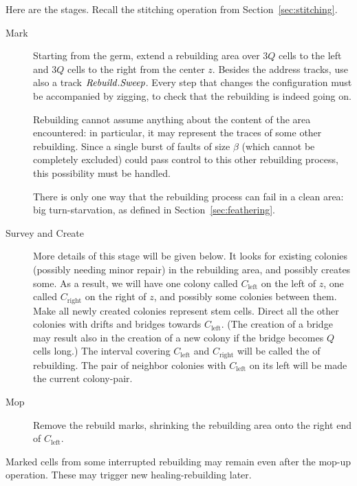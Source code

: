 \documentclass[11pt]{memoir}
\theoremstyle{definition} %
\newcommand{\fld}[1]{\ensuremath{\textit{#1\/}}}
\newcommand{\Q}{Q} %
\newcommand{\Left}{\text{left}}
\newcommand{\Right}{\text{right}}
\newcommand{\Rebuild}{\fld{Rebuild}} %
\newcommand{\Sweep}{\fld{Sweep}} %
\begin{document}
Here are the stages.
Recall the stitching operation from Section~\ref{sec:stitching}.
\begin{description}
 \item[Mark] Starting from the germ, extend a rebuilding area  over \( 3\Q \) cells to the left
and \( 3\Q \) cells to the right from the center \( z \).
Besides the address tracks, use also a track \( \Rebuild.\Sweep \).
Every step that changes the configuration must be accompanied by zigging, to check that
the rebuilding is indeed going on.

Rebuilding cannot assume anything about the content of the area encountered: in particular,
it may represent the traces of some other rebuilding.
Since a single burst of faults of size \( \beta \) (which cannot be completely excluded) could pass
control to this other rebuilding process, this possibility must be handled.

There is only one way that the rebuilding process can fail in a clean area: big turn-starvation,
as defined in Section~\ref{sec:feathering}.

 \item[Survey and Create]
More details of this stage will be given below.
It looks for existing colonies (possibly needing minor repair) in the rebuilding area, and 
possibly creates some.
As a result, we will have one colony called \( C_{\Left} \) 
on the left of \( z \), one called \( C_{\Right} \) on the right of \( z \),
and possibly some colonies between them.
Make all newly created colonies represent stem cells.
Direct all the other colonies with drifts and bridges towards \( C_{\Left} \).
(The creation of a bridge may result also in the creation of a new 
colony if the bridge becomes \( \Q \) cells long.)
The interval covering \( C_{\Left} \) and \( C_{\Right} \)
will be called the  of rebuilding.
The pair of neighbor colonies with \( C_{\Left} \) on its left will be made the current colony-pair.

\item[Mop] Remove the rebuild marks, shrinking the rebuilding area onto the right end of \( C_{\Left} \).
\end{description}

Marked cells from some interrupted rebuilding may remain even after the mop-up operation.
These may trigger new healing-rebuilding later.
\end{document}
